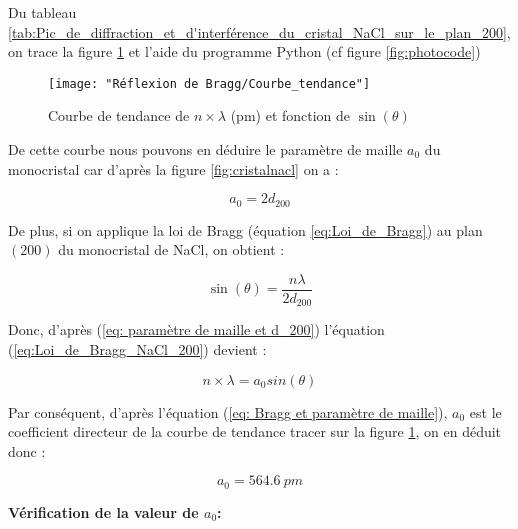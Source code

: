 Du tableau \ref{tab:Pic_de_diffraction_et_d'interférence_du_cristal_NaCl_sur_le_plan_200}, on trace la figure \ref{fig:courbetendance} et l'aide du programme Python (cf figure \ref{fig:photocode})


\begin{figure}[h!]
	\centering
	\texttt{[image: "Réflexion de Bragg/Courbe\_tendance"]}
	\caption{Courbe de tendance de $n \times \lambda $ (pm) et fonction de 	$\sin(\theta)$ }
	\label{fig:courbetendance}
\end{figure}


De cette courbe nous pouvons en déduire le paramètre de maille $a_0$ du monocristal car d'après la figure \ref{fig:cristalnacl} on a :
	
	\begin{equation}\label{eq: paramètre de maille et d_200}
		a_0=2d_{200}
	\end{equation}

	
De plus, si on applique la loi de Bragg (équation \ref{eq:Loi_de_Bragg}) au plan $(200)$ du monocristal de NaCl, on obtient : 

\begin{equation} \label{eq:Loi_de_Bragg_NaCl_200}
	\sin (\theta ) = \frac{n \lambda }{2 d_{200}}
\end{equation}
	
	
Donc, d'après (\ref{eq: paramètre de maille et d_200}) l'équation (\ref{eq:Loi_de_Bragg_NaCl_200}) devient :
	
	\begin{equation}\label{eq: Bragg et paramètre de maille}
		n \times \lambda = a_0sin(\theta)
	\end{equation}
	
	
	Par conséquent, d'après l'équation (\ref{eq: Bragg et paramètre de maille}), $a_0$ est le coefficient directeur de la courbe  de tendance tracer sur la figure \ref{fig:courbetendance}, on en déduit donc :
	
	\begin{equation} \label{eq: paramètre de maille NaCl avec système RX}
		\boxed{a_0 = 564.6 \ pm}
	\end{equation}
	




 \begin{flushleft}
	\textbf{Vérification de la valeur de $a_0$:}
\end{flushleft}



